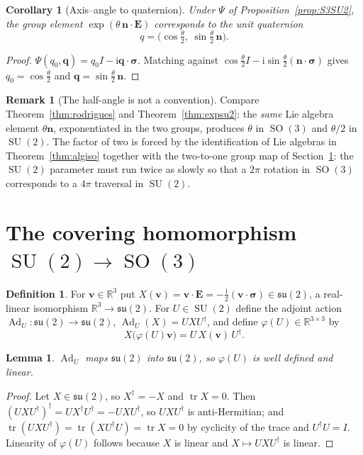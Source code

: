 \documentclass[11pt]{article}
\DeclareMathOperator{\tr}{tr}
\DeclareMathOperator{\Ad}{Ad}
\DeclareMathOperator{\SO}{SO}
\DeclareMathOperator{\SU}{SU}
\newcommand{\su}{\mathfrak{su}}
\newcommand{\R}{\mathbb{R}}
\newcommand{\vv}[1]{\bm{#1}}
\newcommand{\ii}{\mathrm{i}}
\newcommand{\halfth}{\tfrac{\theta}{2}}
\theoremstyle{plain}
\newtheorem{lemma}[theorem]{Lemma}
\newtheorem{corollary}[theorem]{Corollary}
\theoremstyle{definition}
\newtheorem{definition}[theorem]{Definition}
\newtheorem{remark}[theorem]{Remark}
\begin{document}
\begin{corollary}[Axis--angle to quaternion]\label{cor:axisangle}
Under $\Psi$ of Proposition~\ref{prop:S3SU2}, the group element $\exp(\theta\,\vv n\cdot\vv E)$
corresponds to the unit quaternion
\[
q=\Big(\cos\halfth,\ \sin\halfth\,\vv n\Big).
\]
\end{corollary}

\begin{proof}
$\Psi(q_0,\vv q)=q_0I-\ii\vv q\cdot\vv\sigma$. Matching against
$\cos\halfth I-\ii\sin\halfth(\vv n\cdot\vv\sigma)$ gives $q_0=\cos\halfth$ and
$\vv q=\sin\halfth\,\vv n$.
\end{proof}

\begin{remark}[The half-angle is not a convention]
Compare Theorem~\ref{thm:rodrigues} and Theorem~\ref{thm:expsu2}: the \emph{same} Lie algebra
element $\theta\vv n$, exponentiated in the two groups, produces $\theta$ in $\SO(3)$ and
$\theta/2$ in $\SU(2)$. The factor of two is forced by the identification of Lie algebras in
Theorem~\ref{thm:algiso} together with the two-to-one group map of Section~\ref{sec:cover}: the
$\SU(2)$ parameter must run twice as slowly so that a $2\pi$ rotation in $\SO(3)$ corresponds to a
$4\pi$ traversal in $\SU(2)$.
\end{remark}

\section{The covering homomorphism $\SU(2)\to\SO(3)$}\label{sec:cover}

\begin{definition}
For $\vv v\in\R^3$ put $X(\vv v)=\vv v\cdot\vv E=-\tfrac{\ii}{2}(\vv v\cdot\vv\sigma)\in\su(2)$, a
real-linear isomorphism $\R^3\to\su(2)$. For $U\in\SU(2)$ define the adjoint action
$\Ad_U:\su(2)\to\su(2)$, $\Ad_U(X)=UXU^{\dagger}$, and define $\varphi(U)\in\R^{3\times3}$ by
\[
X\big(\varphi(U)\vv v\big)=U\,X(\vv v)\,U^{\dagger}.
\]
\end{definition}

\begin{lemma}\label{lem:welldef}
$\Ad_U$ maps $\su(2)$ into $\su(2)$, so $\varphi(U)$ is well defined and linear.
\end{lemma}

\begin{proof}
Let $X\in\su(2)$, so $X^\dagger=-X$ and $\tr X=0$. Then
$(UXU^{\dagger})^{\dagger}=U X^{\dagger}U^{\dagger}=-UXU^{\dagger}$, so $UXU^\dagger$ is
anti-Hermitian; and $\tr(UXU^{\dagger})=\tr(XU^{\dagger}U)=\tr X=0$ by cyclicity of the trace and
$U^\dagger U=I$. Linearity of $\varphi(U)$ follows because $X$ is linear and
$X\mapsto UXU^\dagger$ is linear.
\end{proof}
\end{document}
